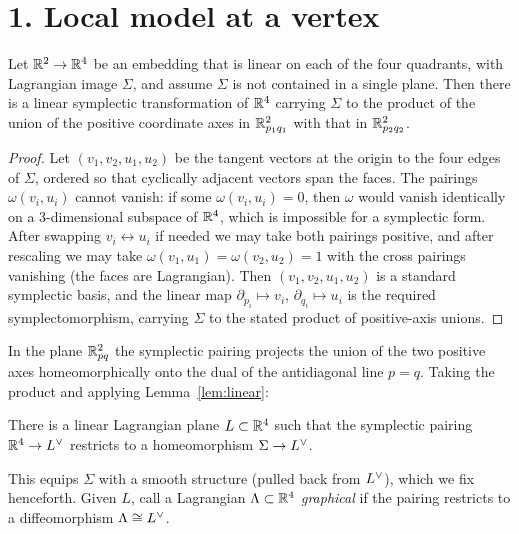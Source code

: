 \documentclass[11pt]{article}
\begin{document}
\section*{1. Local model at a vertex}

\begin{qeightlemma}\label{lem:linear}
Let $\mathbb{R}^2\to\mathbb{R}^4$ be an embedding that is linear on each of the four quadrants,
with Lagrangian image $\Sigma$, and assume $\Sigma$ is not contained in a single
plane. Then there is a linear symplectic transformation of $\mathbb{R}^4$ carrying
$\Sigma$ to the product of the union of the positive coordinate axes in
$\mathbb{R}^2_{p_1q_1}$ with that in $\mathbb{R}^2_{p_2q_2}$.
\end{qeightlemma}

\begin{proof}
Let $(v_1,v_2,u_1,u_2)$ be the tangent vectors at the origin to the four edges of
$\Sigma$, ordered so that cyclically adjacent vectors span the faces. The
pairings $\omega(v_i,u_i)$ cannot vanish: if some $\omega(v_i,u_i)=0$, then
$\omega$ would vanish identically on a $3$-dimensional subspace of $\mathbb{R}^4$, which
is impossible for a symplectic form. After swapping $v_i\leftrightarrow u_i$ if
needed we may take both pairings positive, and after rescaling we may take
$\omega(v_1,u_1)=\omega(v_2,u_2)=1$ with the cross pairings vanishing (the faces
are Lagrangian). Then $(v_1,v_2,u_1,u_2)$ is a standard symplectic basis, and the
linear map $\partial_{p_i}\mapsto v_i$, $\partial_{q_i}\mapsto u_i$ is the
required symplectomorphism, carrying $\Sigma$ to the stated product of
positive-axis unions.
\end{proof}

In the plane $\mathbb{R}^2_{pq}$ the symplectic pairing projects the union of the two
positive axes homeomorphically onto the dual of the antidiagonal line $p=q$.
Taking the product and applying Lemma~\ref{lem:linear}:

\begin{qeightcorollary}\label{cor:Ldual}
There is a linear Lagrangian plane $L\subset\mathbb{R}^4$ such that the symplectic
pairing $\mathbb{R}^4\to L^{\vee}$ restricts to a homeomorphism $\Sigma\to L^{\vee}$.
\end{qeightcorollary}

This equips $\Sigma$ with a smooth structure (pulled back from $L^{\vee}$), which
we fix henceforth. Given $L$, call a Lagrangian $\Lambda\subset\mathbb{R}^4$
\emph{graphical} if the pairing restricts to a diffeomorphism $\Lambda\cong L^{\vee}$.
\end{document}
